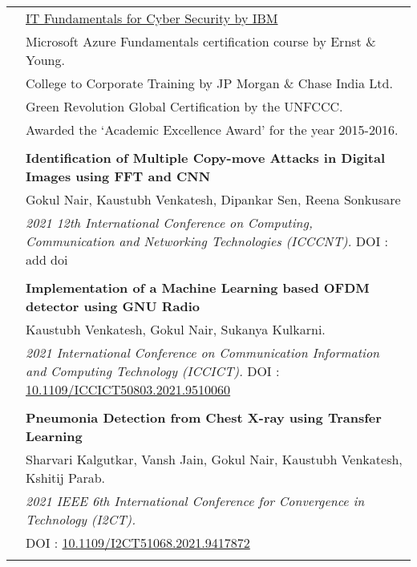 \documentclass[letterpaper, 10pt]{article}
\begin{document}
\begin{longtable}{p{1.3in}p{4.8in}}

{\color{OliveGreen}{Awards and}} 
& \href{https://coursera.org/share/873ac303647846970ff59ac138eee553}{IT Fundamentals for Cyber Security by IBM}\\
{\color{OliveGreen}{Certifications}} 
& Microsoft Azure Fundamentals certification course by Ernst \& Young.\\
& College to Corporate Training by JP Morgan \& Chase India Ltd. \\
& Green Revolution Global Certification by the UNFCCC.\\
& Awarded the ‘Academic Excellence Award’ for the year 2015-2016. \\
& \\

\nohyphens{\color{OliveGreen}{Projects \& Publications}} 
& \textbf{Identification of Multiple Copy-move Attacks in Digital Images using FFT and CNN} \\
& Gokul Nair, Kaustubh Venkatesh, Dipankar Sen, Reena Sonkusare \\
& \textit{2021 12th International Conference on Computing, Communication and Networking Technologies (ICCCNT).} DOI : add doi \\
& \\

& \textbf{Implementation of a Machine Learning based OFDM detector using GNU Radio} \\
& Kaustubh Venkatesh, Gokul Nair, Sukanya Kulkarni. \\
& \textit{2021 International Conference on Communication Information and Computing Technology (ICCICT).} DOI : \href{https://ieeexplore.ieee.org/document/9510060}{10.1109/ICCICT50803.2021.9510060} \\
& \\

& \textbf{Pneumonia Detection from Chest X-ray using Transfer Learning} \\
& Sharvari Kalgutkar, Vansh Jain, Gokul Nair, Kaustubh Venkatesh, Kshitij Parab. \\
& \textit{2021 IEEE 6th International Conference for Convergence in Technology (I2CT).}\\
& DOI : \href{https://ieeexplore.ieee.org/document/9417872}{10.1109/I2CT51068.2021.9417872}\\
\\



\end{longtable}
\end{document}
